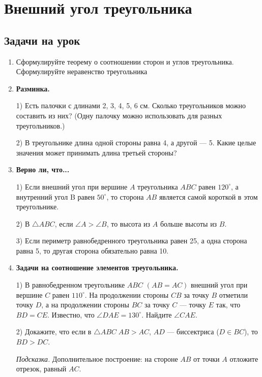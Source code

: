 \chapter{Внешний угол треугольника}

\section{Задачи на урок}

\begin{enumerate}

    \item Сформулируйте теорему о соотношении сторон и углов треугольника. Сформулируйте неравенство треугольника 

    \item \textbf{Разминка.} 

    1) Есть палочки с длинами 2, 3, 4, 5, 6 см. Сколько треугольников можно составить из них? (Одну палочку можно использовать для разных треугольников.)

    2) В треугольнике длина одной стороны равна 4, а
другой --- 5. Какие целые значения может принимать длина третьей стороны?


    \item \textbf{Верно ли, что...}

    1) Если внешний угол при вершине $A$ треугольника $ABC$ равен $120^\circ$, а внутренний угол B равен $50^\circ$, то сторона $AB$ является самой короткой в этом треугольнике.

    2) В $\triangle{ABC}$, если $\angle{A}>\angle{B}$, то высота из $A$ больше высоты из $B$.

    3) Если периметр равнобедренного треугольника равен 25, а одна сторона равна 5, то другая сторона обязательно равна 10.

    \item \textbf{Задачи на соотношение элементов треугольника.} 
    
    1) В равнобедренном треугольнике $ABC$ $(AB=AC)$ внешний угол при вершине $C$ равен $110^\circ$. На продолжении стороны $CB$ за точку $B$ отметили точку $D$, а на продолжении стороны $BC$ за точку $C$ --- точку $E$ так, что $BD=CE$. Известно, что $\angle{DAE}=130^\circ$. Найдите $\angle{CAE}$.

    2) Докажите, что если в $\triangle{ABC} \; AB>AC$, $AD$ --- биссектриса ($D\in{BC}$), то $BD>DC$.

    \textit{Подсказка.} Дополнительное построение: на стороне $AB$ от точки $A$ отложите отрезок, равный $AC$.


\end{enumerate}
